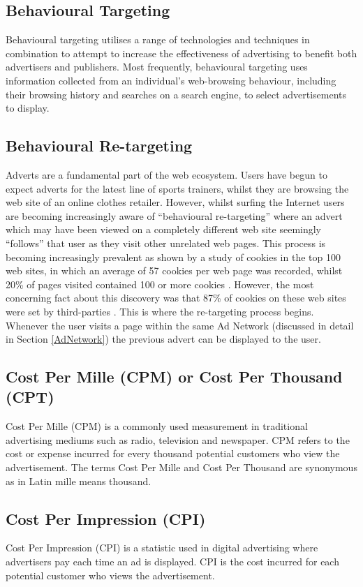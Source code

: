 \documentclass[12pt]{article}
\begin{document}
\subsection{Behavioural Targeting}
Behavioural targeting utilises a range of technologies and techniques in combination to attempt to increase the effectiveness of advertising to benefit both advertisers and publishers. Most frequently, behavioural targeting uses information collected from an individual’s web-browsing behaviour, including their browsing history and searches on a search engine, to select advertisements to display. 

\subsection{Behavioural Re-targeting}
Adverts are a fundamental part of the web ecosystem. Users have begun to expect adverts for the latest line of sports trainers, whilst they are browsing the web site of an online clothes retailer. However, whilst surfing the Internet users are becoming increasingly aware of ``behavioural re-targeting'' where an advert which may have been viewed on a completely different web site seemingly ``follows'' that user as they visit other unrelated web pages. This process is becoming increasingly prevalent as shown by a study of cookies in the top 100 web sites, in which an average of 57 cookies per web page was recorded, whilst 20\% of pages visited contained 100 or more cookies \parencite{taOffer}. However, the most concerning fact about this discovery was that 87\% of cookies on these web sites were set by third-parties \parencite{taOffer}. This is where the re-targeting process begins. Whenever the user visits a page within the same Ad Network (discussed in detail in Section \ref{AdNetwork}) the previous advert can be displayed to the user.

\subsection{Cost Per Mille (CPM) or Cost Per Thousand (CPT)} \label{cpm}
Cost Per Mille (CPM) is a commonly used measurement in traditional advertising mediums such as radio, television and newspaper. CPM refers to the cost or expense incurred for every thousand potential customers who view the advertisement. The terms Cost Per Mille and Cost Per Thousand are synonymous as in Latin mille means thousand. 

\subsection{Cost Per Impression (CPI)}
Cost Per Impression (CPI) is a statistic used in digital advertising where advertisers pay each time an ad is displayed. CPI is the cost incurred for each potential customer who views the advertisement.
\end{document}
